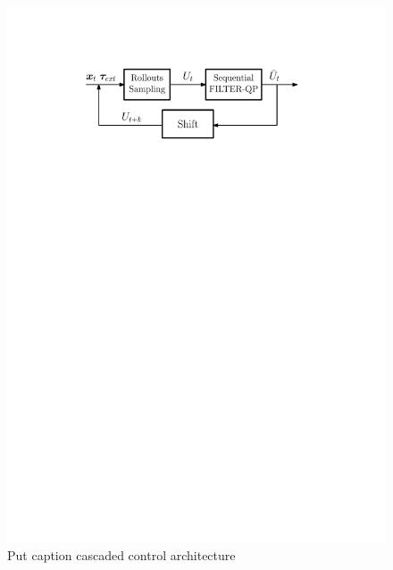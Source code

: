 \begin{figure}[t!]
\centering
\hspace*{-1.0cm}
\includegraphics[width=0.8\columnwidth]{figures/schemes/stochastic_controller.pdf}
\caption{Put caption cascaded control architecture} \label{fig:cascaded_architecture}
\end{figure}

